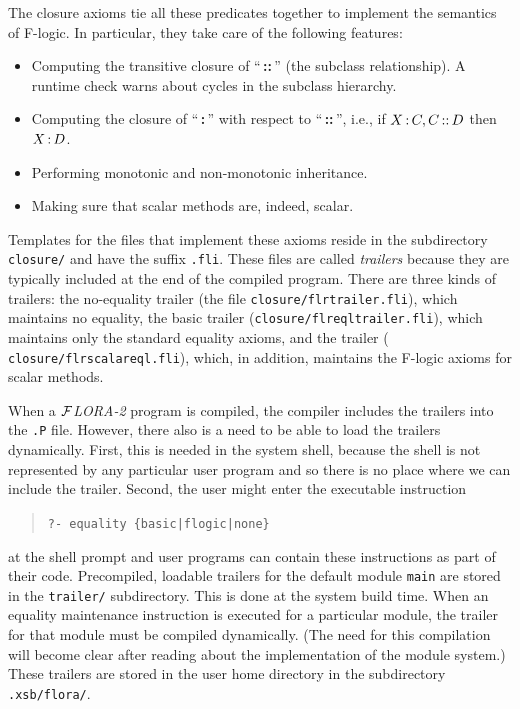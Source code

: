 \documentclass[11pt]{article}
\newcommand{\isa}{\,{\bf{:}}\,}
\newcommand{\subcl}{\,{\bf{::}}\,}
\newcommand{\FLORA}{{\mbox{${\cal F}${\small\it LORA}\rm\emph{-2}}}\xspace}
\newcommand{\fl}{\mbox{F-logic}\xspace}
\begin{document}
The closure axioms tie all these predicates together to implement the
semantics of \fl. In particular, they take care of the following features:
\begin{itemize}
\item Computing the transitive closure of ``\subcl'' (the subclass
  relationship).  A runtime check warns about cycles in the subclass
  hierarchy.
\item Computing the closure of ``\isa'' with respect to ``\subcl'', i.e.,
  if $X\isa C, C\subcl D$ then $X\isa D$.
\item Performing monotonic and non-monotonic inheritance.
\item Making sure that scalar methods are, indeed, scalar.
\end{itemize}
Templates for the files that implement these axioms reside in the
subdirectory \texttt{closure/} and have the suffix {\tt .fli}.  These files
are called \emph{trailers} because they are typically included at the end
of the compiled program.  There are three kinds of trailers: the
no-equality trailer (the file {\tt closure/flrtrailer.fli}), which
maintains no equality, the basic trailer ({\tt closure/flreqltrailer.fli}),
which maintains only the standard equality axioms, and the trailer ({\tt
  closure/flrscalareql.fli}), which, in addition, maintains the \fl axioms
for scalar methods.

When a \FLORA program is compiled, the compiler includes the trailers into
the {\tt .P} file. However, there also is a need to be able to load the
trailers dynamically. First, this is needed in the system shell, because
the shell is not represented by any particular user program and so there is
no place where we can include the trailer. Second, the user might enter the
executable instruction 
\begin{quote}
   {\tt ?- equality \{basic|flogic|none\} }
\end{quote}
at the shell prompt and user programs can contain these instructions as
part of their code. Precompiled, loadable trailers for the default module
{\tt main} are stored in the {\tt trailer/} subdirectory. This is done at
the system build time.  When an equality maintenance instruction is
executed for a particular module, the trailer for that module must be
compiled dynamically.  (The need for this compilation will become clear
after reading about the implementation of the module system.)  These
trailers are stored in the user home directory in the subdirectory {\tt
  .xsb/flora/}.
\end{document}
